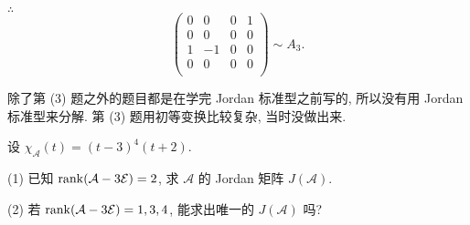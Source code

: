 \documentclass[color=black,device=normal,lang=cn,mode=geye]{elegantnote}
\begin{document}
\begin{solution}
    $\therefore$
    \[\begin{pmatrix}
        0 & 0 & 0 & 1 \\
        0 & 0 & 0 & 0 \\
        1 & -1 & 0 & 0 \\
        0 & 0 & 0 & 0 \\
    \end{pmatrix}\sim A_3.\]
\end{solution}
\begin{note}
    除了第 (3) 题之外的题目都是在学完 Jordan 标准型之前写的, 所以没有用 Jordan 标准型来分解. 第 (3) 题用初等变换比较复杂, 当时没做出来.
\end{note}
\begin{exercise}%
    设 $\chi_\mathcal{A}(t)=(t-3)^4(t+2)$.

    (1) 已知 $\operatorname{rank} (\mathcal{A}-3\mathcal{E})=2$, 求 $\mathcal{A}$ 的 Jordan 矩阵 $J(\mathcal{A})$.

    (2) 若 $\operatorname{rank} (\mathcal{A}-3\mathcal{E})=1,3,4$, 能求出唯一的 $J(\mathcal{A})$ 吗?
\end{exercise}
\end{document}
